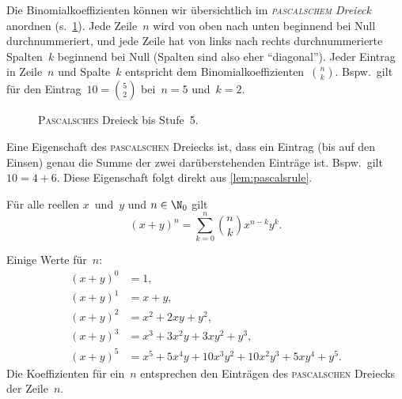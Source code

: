 \documentclass[a4paper]{article}
\begin{document}
Die Binomialkoeffizienten können wir übersichtlich im \emph{\textsc{pascalschem} Dreieck} anordnen (s.~\cref{fig:pascalstriangle}). Jede Zeile~$n$ wird von oben nach unten beginnend bei Null durchnummeriert, und jede Zeile hat von links nach rechts durchnummerierte Spalten~$k$ beginnend bei Null (Spalten sind also eher "`diagonal"'). Jeder Eintrag in Zeile~$n$ und Spalte~$k$ entspricht dem Binomialkoeffizienten~$\binom{n}{k}$. Bspw.\ gilt für den Eintrag~$10 = \binom{5}{2}$ bei~$n = 5$ und~$k = 2$.

\begin{figure}[htbp]
    \caption{\textsc{Pascalsches} Dreieck bis Stufe~5.}\label{fig:pascalstriangle}
\end{figure}

Eine Eigenschaft des \textsc{pascalschen} Dreiecks ist, dass ein Eintrag (bis auf den Einsen) genau die Summe der zwei darüberstehenden Einträge ist. Bspw.\ gilt~$10 = 4 + 6$. Diese Eigenschaft folgt direkt aus \cref{lem:pascalsrule}.

\begin{theorem}
    Für alle reellen $x$~und~$y$ und $n \in \N_0$ gilt
    \begin{equation*}
        (x + y)^n = \sum_{k = 0}^n \binom{n}{k} x^{n - k} y^k.
    \end{equation*}
\end{theorem}

Einige Werte für~$n$:
\begin{align*}
    (x+y)^0 & = 1,                                               \\
    (x+y)^1 & = x+y,                                             \\
    (x+y)^2 & = x^2 + 2xy + y^2,                                 \\
    (x+y)^3 & = x^3 + 3x^2y + 3xy^2 + y^3,                       \\
    (x+y)^5 & = x^5 + 5x^4y + 10x^3y^2 + 10x^2y^3 + 5xy^4 + y^5.
\end{align*}
Die Koeffizienten für ein~$n$ entsprechen den Einträgen des \textsc{pascalschen} Dreiecks der Zeile~$n$.
\end{document}
